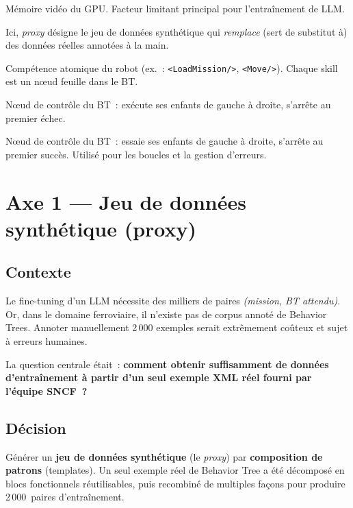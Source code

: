 \documentclass[a4paper,11pt]{article}
\newcommand{\skill}[1]{\texttt{<#1/>}}
\begin{document}
\begin{description}[leftmargin=3.5cm, style=nextline]
    \item[VRAM] Mémoire vidéo du GPU. Facteur limitant principal pour
    l'entraînement de LLM.
    \item[Proxy (jeu de données)] Ici, \emph{proxy} désigne le jeu de
    données synthétique qui \emph{remplace} (sert de substitut à) des
    données réelles annotées à la main.
    \item[Skill] Compétence atomique du robot (ex.~: \skill{LoadMission},
    \skill{Move}). Chaque skill est un nœud feuille dans le BT.
    \item[Sequence] Nœud de contrôle du BT~: exécute ses enfants de gauche
    à droite, s'arrête au premier échec.
    \item[Fallback] Nœud de contrôle du BT~: essaie ses enfants de gauche
    à droite, s'arrête au premier succès. Utilisé pour les boucles et la
    gestion d'erreurs.
\end{description}

\newpage
\section{Axe 1 --- Jeu de données synthétique (proxy)}
\label{sec:proxy}

\subsection{Contexte}

Le fine-tuning d'un LLM nécessite des milliers de paires
\emph{(mission, BT attendu)}. Or, dans le domaine ferroviaire, il n'existe
pas de corpus annoté de Behavior Trees. Annoter manuellement 2\,000 exemples
serait extrêmement coûteux et sujet à erreurs humaines.

La question centrale était~: \textbf{comment obtenir suffisamment de données
d'entraînement à partir d'un seul exemple XML réel fourni par l'équipe
SNCF~?}

\subsection{Décision}

Générer un \textbf{jeu de données synthétique} (le \emph{proxy}) par
\textbf{composition de patrons} (templates). Un seul exemple réel de
Behavior Tree a été décomposé en blocs fonctionnels réutilisables, puis
recombiné de multiples façons pour produire 2\,000~paires d'entraînement.
\end{document}
